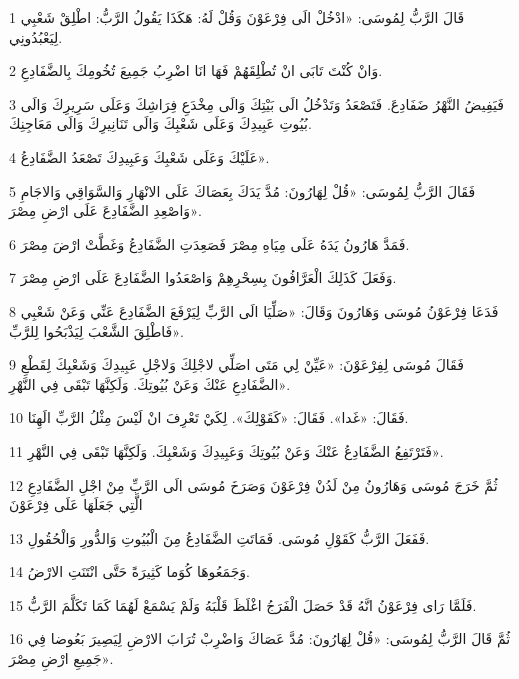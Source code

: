 \par 1 قَالَ الرَّبُّ لِمُوسَى: «ادْخُلْ الَى فِرْعَوْنَ وَقُلْ لَهُ: هَكَذَا يَقُولُ الرَّبُّ: اطْلِقْ شَعْبِي لِيَعْبُدُونِي.
\par 2 وَانْ كُنْتَ تَابَى انْ تُطْلِقَهُمْ فَهَا انَا اضْرِبُ جَمِيعَ تُخُومِكَ بِالضَّفَادِعِ.
\par 3 فَيَفِيضُ النَّهْرُ ضَفَادِعَ. فَتَصْعَدُ وَتَدْخُلُ الَى بَيْتِكَ وَالَى مِخْدَعِ فِرَاشِكَ وَعَلَى سَرِيرِكَ وَالَى بُيُوتِ عَبِيدِكَ وَعَلَى شَعْبِكَ وَالَى تَنَانِيرِكَ وَالَى مَعَاجِنِكَ.
\par 4 عَلَيْكَ وَعَلَى شَعْبِكَ وَعَبِيدِكَ تَصْعَدُ الضَّفَادِعُ».
\par 5 فَقَالَ الرَّبُّ لِمُوسَى: «قُلْ لِهَارُونَ: مُدَّ يَدَكَ بِعَصَاكَ عَلَى الانْهَارِ وَالسَّوَاقِي وَالاجَامِ وَاصْعِدِ الضَّفَادِعَ عَلَى ارْضِ مِصْرَ».
\par 6 فَمَدَّ هَارُونُ يَدَهُ عَلَى مِيَاهِ مِصْرَ فَصَعِدَتِ الضَّفَادِعُ وَغَطَّتْ ارْضَ مِصْرَ.
\par 7 وَفَعَلَ كَذَلِكَ الْعَرَّافُونَ بِسِحْرِهِمْ وَاصْعَدُوا الضَّفَادِعَ عَلَى ارْضِ مِصْرَ.
\par 8 فَدَعَا فِرْعَوْنُ مُوسَى وَهَارُونَ وَقَالَ: «صَلِّيَا الَى الرَّبِّ لِيَرْفَعَ الضَّفَادِعَ عَنِّي وَعَنْ شَعْبِي فَاطْلِقَ الشَّعْبَ لِيَذْبَحُوا لِلرَّبِّ».
\par 9 فَقَالَ مُوسَى لِفِرْعَوْنَ: «عَيِّنْ لِي مَتَى اصَلِّي لاجْلِكَ وَلاجْلِ عَبِيدِكَ وَشَعْبِكَ لِقَطْعِ الضَّفَادِعِ عَنْكَ وَعَنْ بُيُوتِكَ. وَلَكِنَّهَا تَبْقَى فِي النَّهْرِ».
\par 10 فَقَالَ: «غَدا». فَقَالَ: «كَقَوْلِكَ». لِكَيْ تَعْرِفَ انْ لَيْسَ مِثْلُ الرَّبِّ الَهِنَا.
\par 11 فَتَرْتَفِعُ الضَّفَادِعُ عَنْكَ وَعَنْ بُيُوتِكَ وَعَبِيدِكَ وَشَعْبِكَ. وَلَكِنَّهَا تَبْقَى فِي النَّهْرِ».
\par 12 ثُمَّ خَرَجَ مُوسَى وَهَارُونُ مِنْ لَدُنْ فِرْعَوْنَ وَصَرَخَ مُوسَى الَى الرَّبِّ مِنْ اجْلِ الضَّفَادِعِ الَّتِي جَعَلَهَا عَلَى فِرْعَوْنَ
\par 13 فَفَعَلَ الرَّبُّ كَقَوْلِ مُوسَى. فَمَاتَتِ الضَّفَادِعُ مِنَ الْبُيُوتِ وَالدُّورِ وَالْحُقُولِ.
\par 14 وَجَمَعُوهَا كُوَما كَثِيرَةً حَتَّى انْتَنَتِ الارْضُ.
\par 15 فَلَمَّا رَاى فِرْعَوْنُ انَّهُ قَدْ حَصَلَ الْفَرَجُ اغْلَظَ قَلْبَهُ وَلَمْ يَسْمَعْ لَهُمَا كَمَا تَكَلَّمَ الرَّبُّ.
\par 16 ثُمَّ قَالَ الرَّبُّ لِمُوسَى: «قُلْ لِهَارُونَ: مُدَّ عَصَاكَ وَاضْرِبْ تُرَابَ الارْضِ لِيَصِيرَ بَعُوضا فِي جَمِيعِ ارْضِ مِصْرَ».
